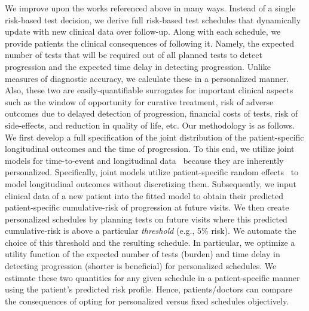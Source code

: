 We improve upon the works referenced above in many ways. Instead of a single risk-based test decision, we derive full risk-based test schedules that dynamically update with new clinical data over follow-up. Along with each schedule, we provide patients the clinical consequences of following it. Namely, the expected number of tests that will be required out of all planned tests to detect progression and the expected time delay in detecting progression. Unlike measures of diagnostic accuracy, we calculate these in a personalized manner. Also, these two are easily-quantifiable surrogates for important clinical aspects such as the window of opportunity for curative treatment, risk of adverse outcomes due to delayed detection of progression, financial costs of tests, risk of side-effects, and reduction in quality of life, etc. Our methodology is as follows. We first develop a full specification of the joint distribution of the patient-specific longitudinal outcomes and the time of progression. To this end, we utilize joint models for time-to-event and longitudinal data~\citep{tsiatis2004joint,rizopoulos2012joint} because they are inherently personalized. Specifically, joint models utilize patient-specific random effects~\citep{mcculloch2005generalized} to model longitudinal outcomes without discretizing them. Subsequently, we input clinical data of a new patient into the fitted model to obtain their predicted patient-specific cumulative-risk of progression at future visits. We then create personalized schedules by planning tests on future visits where this predicted cumulative-risk is above a particular \emph{threshold} (e.g., 5\% risk). We automate the choice of this threshold and the resulting schedule. In particular, we optimize a utility function of the expected number of tests (burden) and time delay in detecting progression (shorter is beneficial) for personalized schedules. We estimate these two quantities for any given schedule in a patient-specific manner using the patient's predicted risk profile. Hence, patients/doctors can compare the consequences of opting for personalized versus fixed schedules objectively.

